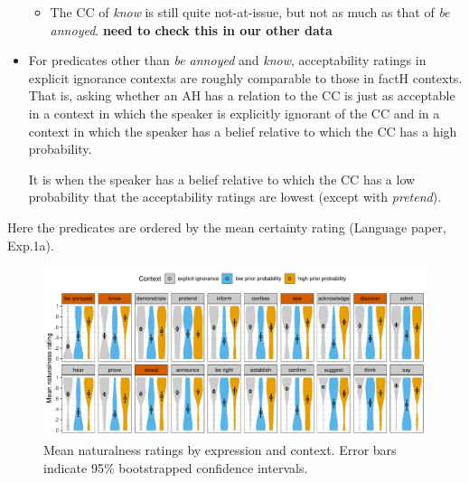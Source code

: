 \documentclass[11pt,fleqn]{article}
\newcommand{\6}{\mbox{$[\hspace*{-.6mm}[$}}
\newcommand{\9}{\mbox{$]\hspace*{-.6mm}]$}}
\begin{document}
\begin{itemize}
\begin{itemize}
\item The CC of {\em know} is still quite not-at-issue, but not as much as that of {\em be annoyed}. {\bf need to check this in our other data}

\end{itemize}

\item For predicates other than {\em be annoyed} and {\em know}, acceptability ratings in explicit ignorance contexts are roughly comparable to those in factH contexts. That is, asking whether an AH has a relation to the CC is just as acceptable in a context in which the speaker is explicitly ignorant of the CC and in a context in which the speaker has a belief relative to which the CC has a high probability.

It is when the speaker has a belief relative to which the CC has a low probability that the acceptability ratings are lowest (except with {\em pretend}).


\end{itemize}

\newpage

Here the predicates are ordered by the mean certainty rating (Language paper, Exp.1a).

\begin{figure}[h!]
\centering
\includegraphics[width=.8\textwidth]{../../results/main/13explicitIgnorance/graphs/ORDER-by-LANGUAGE-naturalness-by-context-and-predicate}
\caption{Mean naturalness ratings by expression and context. Error bars indicate 95\% bootstrapped confidence intervals.}\label{fig:acc-by-context}
\end{figure}
\end{document}
